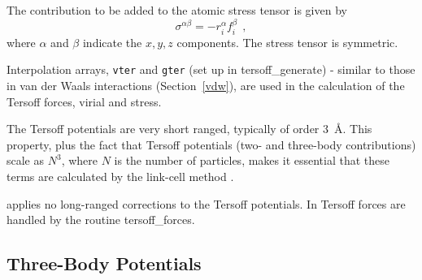 The contribution to be added to the atomic stress
tensor is given by
\begin{equation}
\sigma^{\alpha \beta} = -r_{i}^{\alpha} f_{i}^{\beta}~~,
\end{equation}
where $\alpha$ and $\beta$ indicate the $x,y,z$ components.  The
stress tensor is symmetric.

Interpolation arrays, {\tt vter} and {\tt gter} (set up in
{\sc tersoff\_generate}) - similar to those in van der Waals
interactions (Section~\ref{vdw}), are used in the calculation
of the Tersoff forces, virial and stress.

The Tersoff potentials are very short
ranged, typically of order $3$~\AA.  This property, plus the fact
that Tersoff potentials (two- and
three-body contributions) scale as $N^{3}$, where $N$ is the number
of particles, makes it essential that these terms are calculated by
the link-cell method \cite{eastwood-80a}.

\D applies no long-ranged corrections to the
Tersoff potentials.  In \D Tersoff forces
are handled by the routine {\sc tersoff\_forces}.

\subsection{Three-Body Potentials}
\label{three-body}

